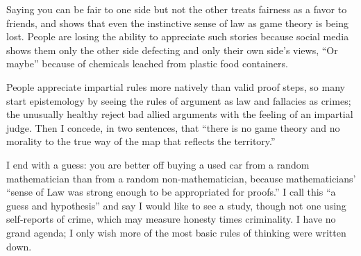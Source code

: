 Saying you can be fair to one side but not the other treats fairness as a favor to friends, and shows that even the instinctive sense of law as game theory is being lost. People are losing the ability to appreciate such stories because social media shows them only the other side defecting and only their own side's views, ``Or maybe'' because of chemicals leached from plastic food containers.

People appreciate impartial rules more natively than valid proof steps, so many start epistemology by seeing the rules of argument as law and fallacies as crimes; the unusually healthy reject bad allied arguments with the feeling of an impartial judge. Then I concede, in two sentences, that ``there is no game theory and no morality to the true way of the map that reflects the territory.'' 

I end with a guess: you are better off buying a used car from a random mathematician than from a random non-mathematician, because mathematicians' ``sense of Law was strong enough to be appropriated for proofs.'' I call this ``a guess and hypothesis'' and say I would like to see a study, though not one using self-reports of crime, which may measure honesty times criminality. I have no grand agenda; I only wish more of the most basic rules of thinking were written down.
